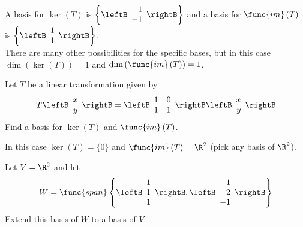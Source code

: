 \begin{enumialphparenastyle}
\begin{ex}
\begin{sol}
A basis for $\ker \left( T\right)$ is 
$\left\{ \leftB 
\begin{array}{r}
1 \\ 
-1 
\end{array}
\rightB \right\}$ 
and a basis for $\func{im} \left( T\right)$ is 
$\left\{ \leftB 
\begin{array}{r}
1 \\ 
1 
\end{array}
\rightB \right\}$. \\
There are many other possibilities for the specific bases, but in this case 
$\dim \left( \ker \left( T\right) \right)=1 $ and $\dim \left( \func{im} \left( T\right) \right)=1$.
\end{sol}

\end{ex}


\begin{ex}
 Let $T$ be a linear transformation given by 
\[
T \leftB \begin{array}{r}
x\\
y
\end{array}\rightB = \leftB \begin{array}{rrr}
1 & 0  \\
1 & 1
\end{array}\rightB
\leftB \begin{array}{r}
x\\
y
\end{array}\rightB
\]
Find a basis for $\ker \left( T\right)$ and $\func{im}
\left( T\right) $.

\begin{sol}
In this case $\ker \left( T\right) =\{0\}$ 
and $\func{im} \left( T\right) = \R^2$ (pick any basis of $\R^2$). 
\end{sol}

\end{ex}



\begin{ex}
Let $V=\R^{3}$ and let 
\begin{equation*}
W=\func{span}\left\{ \leftB 
\begin{array}{r}
1 \\ 
1 \\ 
1
\end{array}
\rightB ,\leftB 
\begin{array}{r}
-1 \\ 
2 \\ 
-1
\end{array}
\rightB \right\}
\end{equation*}
Extend this basis of $W$ to a basis of $V$.


\end{ex}
\end{enumialphparenastyle}
